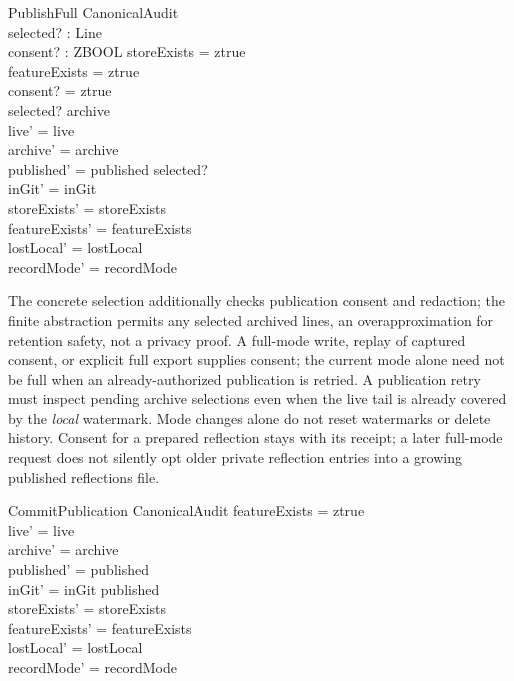 \documentclass[a4paper,10pt,fleqn]{article}
\begin{document}
\begin{schema}{PublishFull}
\Delta CanonicalAudit \\
selected? : \power Line \\
consent? : ZBOOL
\where
storeExists = ztrue \\
featureExists = ztrue \\
consent? = ztrue \\
selected? \subseteq archive \\
live' = live \\
archive' = archive \\
published' = published \cup selected? \\
inGit' = inGit \\
storeExists' = storeExists \\
featureExists' = featureExists \\
lostLocal' = lostLocal \\
recordMode' = recordMode
\end{schema}

The concrete selection additionally checks publication consent and
redaction; the finite abstraction permits any selected archived lines,
an overapproximation for retention safety, not a privacy proof. A
full-mode write, replay of captured consent, or explicit full export
supplies consent; the current mode alone need not be full when an
already-authorized publication is retried. A
publication retry must inspect pending archive selections even when
the live tail is already covered by the \emph{local} watermark. Mode
changes alone do not reset watermarks or delete history. Consent for a
prepared reflection stays with its receipt; a later full-mode request
does not silently opt older private reflection entries into a growing
published reflections file.

\begin{schema}{CommitPublication}
\Delta CanonicalAudit
\where
featureExists = ztrue \\
live' = live \\
archive' = archive \\
published' = published \\
inGit' = inGit \cup published \\
storeExists' = storeExists \\
featureExists' = featureExists \\
lostLocal' = lostLocal \\
recordMode' = recordMode
\end{schema}
\end{document}
